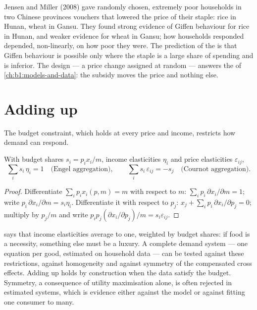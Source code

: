 \begin{record}
Jensen and Miller (2008) gave randomly chosen, extremely poor households in
two Chinese provinces vouchers that lowered the price of their staple:
rice in Hunan, wheat in Gansu. They found strong evidence of Giffen
behaviour for rice in Hunan, and weaker evidence for wheat in Gansu; how
households responded depended, non-linearly, on how poor they
were. %
The prediction of the  is that Giffen behaviour is
possible only where the staple is a large share of spending and is
inferior. The design --- a price change assigned at random --- answers the
 of \cref{ch:b1:models-and-data}: the subsidy moves the
price and nothing else.
\end{record}

\section{Adding up}\label{sec:b1:income-and-substitution-effects:adding-up}

The budget constraint, which holds at every price and income, restricts
how demand can respond.

\begin{proposition}\label{prop:b1:income-and-substitution-effects:aggregation}
With budget shares $s_i = p_ix_i/m$, income elasticities $\eta_i$ and price
elasticities $\varepsilon_{ij}$,
\[
\sum_i s_i\,\eta_i = 1\quad\text{(Engel aggregation)},\qquad
\sum_i s_i\,\varepsilon_{ij} = -s_j\quad\text{(Cournot aggregation)}.
\]
\end{proposition}

\begin{proof}
Differentiate $\sum_i p_ix_i(p, m) = m$ with respect to $m$:
$\sum_i p_i\,\partial x_i/\partial m = 1$; write
$p_i\,\partial x_i/\partial m = s_i\eta_i$. Differentiate it with respect to $p_j$:
$x_j + \sum_i p_i\,\partial x_i/\partial p_j = 0$; multiply by $p_j/m$ and write
$p_ip_j(\partial x_i/\partial p_j)/m = s_i\varepsilon_{ij}$.
\end{proof}

 says that income elasticities average to one, weighted
by budget shares: if food is a necessity, something else must be a luxury.
A complete demand system --- one equation per good, estimated on household
data --- can be tested against these restrictions, against homogeneity and
against symmetry of the compensated cross effects. Adding up holds by
construction when the data satisfy the budget. Symmetry, a consequence of
utility maximisation alone, is often rejected in estimated systems, which
is evidence either against the model or against fitting one consumer to
many.

